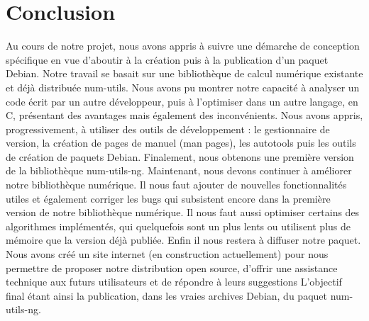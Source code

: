\chapter*{Conclusion}

Au cours de notre projet, nous avons appris \`a suivre une d\'emarche de conception sp\'ecifique en vue d'aboutir \`a la cr\'eation
puis \`a la publication d'un paquet Debian. Notre travail se basait sur une biblioth\`eque de calcul num\'erique existante et d\'ej\`a
distribu\'ee num-utils. Nous avons pu montrer notre capacit\'e \`a analyser un code \'ecrit par un autre d\'eveloppeur, puis \`a l'optimiser dans 
un autre langage, en C, pr\'esentant des avantages mais \'egalement des inconv\'enients. Nous avons appris, progressivement, \`a utiliser des outils
de d\'eveloppement : le gestionnaire de version, la cr\'eation de pages de manuel (man pages), les autotools puis les outils de cr\'eation de paquets Debian. Finalement, nous obtenons une premi\`ere
version de la biblioth\`eque num-utils-ng.
\newline
\newline
Maintenant, nous devons continuer \`a am\'eliorer notre biblioth\`eque num\'erique. Il nous faut ajouter de nouvelles fonctionnalit\'es utiles et \'egalement 
corriger les bugs qui subsistent encore dans la premi\`ere version de notre biblioth\`eque num\'erique. Il nous faut aussi optimiser certains des 
algorithmes impl\'ement\'es, qui quelquefois sont un plus lents ou utilisent plus de m\'emoire que la version d\'ej\`a publi\'ee. Enfin il nous restera \`a
diffuser notre paquet. Nous avons cr\'e\'e un site internet (en construction actuellement) pour nous permettre de proposer notre distribution open source,
d'offrir une assistance technique aux futurs utilisateurs et de r\'epondre \`a leurs suggestions
\newline
\newline
L'objectif final \'etant ainsi la publication, dans les vraies archives Debian, du paquet num-utils-ng.
